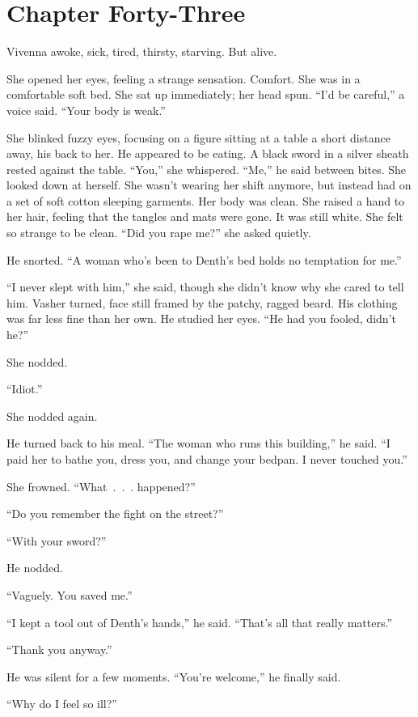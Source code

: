 \section{Chapter Forty-Three}

Vivenna awoke, sick, tired, thirsty, starving. But alive.

She opened her eyes, feeling a strange sensation. Comfort. She was in a comfortable soft bed. She sat up immediately; her head spun. “I’d be careful,” a voice said. “Your body is weak.”

She blinked fuzzy eyes, focusing on a figure sitting at a table a short distance away, his back to her. He appeared to be eating. A black sword in a silver sheath rested against the table. “You,” she whispered. “Me,” he said between bites. She looked down at herself. She wasn’t wearing her shift anymore, but instead had on a set of soft cotton sleeping garments. Her body was clean. She raised a hand to her hair, feeling that the tangles and mats were gone. It was still white. She felt so strange to be clean. “Did you rape me?” she asked quietly.

He snorted. “A woman who’s been to Denth’s bed holds no temptation for me.”

“I never slept with him,” she said, though she didn’t know why she cared to tell him. Vasher turned, face still framed by the patchy, ragged beard. His clothing was far less fine than her own. He studied her eyes. “He had you fooled, didn’t he?”

She nodded.

“Idiot.”

She nodded again.

He turned back to his meal. “The woman who runs this building,” he said. “I paid her to bathe you, dress you, and change your bedpan. I never touched you.”

She frowned. “What~.~.~. happened?”

“Do you remember the fight on the street?”

“With your sword?”

He nodded.

“Vaguely. You saved me.”

“I kept a tool out of Denth’s hands,” he said. “That’s all that really matters.”

“Thank you anyway.”

He was silent for a few moments. “You’re welcome,” he finally said.

“Why do I feel so ill?”

